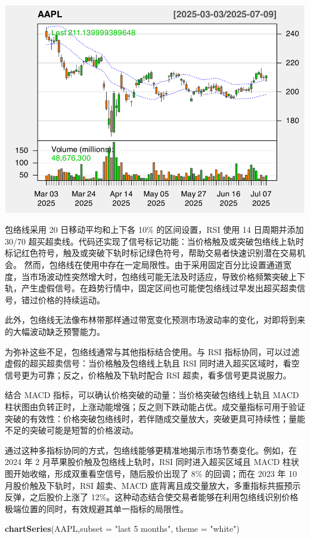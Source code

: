 \documentclass[]{ctexbook}
\newenvironment{Shaded}{\begin{snugshade}}{\end{snugshade}}
\newcommand{\AttributeTok}[1]{\textcolor[rgb]{0.13,0.29,0.53}{#1}}
\newcommand{\FunctionTok}[1]{\textcolor[rgb]{0.13,0.29,0.53}{\textbf{#1}}}
\newcommand{\NormalTok}[1]{#1}
\newcommand{\StringTok}[1]{\textcolor[rgb]{0.31,0.60,0.02}{#1}}
\begin{document}
\includegraphics[width=0.9\linewidth]{quantmod_files/figure-latex/envol-2}

包络线采用 20 日移动平均和上下各 10\% 的区间设置，RSI 使用 14 日周期并添加 30/70 超买超卖线。代码还实现了信号标记功能：当价格触及或突破包络线上轨时标记红色符号，触及或突破下轨时标记绿色符号，帮助交易者快速识别潜在交易机会。
然而，包络线在使用中存在一定局限性。由于采用固定百分比设置通道宽度，当市场波动性突然增大时，包络线可能无法及时适应，导致价格频繁突破上下轨，产生虚假信号。在趋势行情中，固定区间也可能使包络线过早发出超买超卖信号，错过价格的持续运动。

此外，包络线无法像布林带那样通过带宽变化预测市场波动率的变化，对即将到来的大幅波动缺乏预警能力。

为弥补这些不足，包络线通常与其他指标结合使用。与 RSI 指标协同，可以过滤虚假的超买超卖信号：当价格触及包络线上轨且 RSI 同时进入超买区域时，看空信号更为可靠；反之，价格触及下轨时配合 RSI 超卖，看多信号更具说服力。

结合 MACD 指标，可以确认价格突破的动量：当价格突破包络线上轨且 MACD 柱状图由负转正时，上涨动能增强；反之则下跌动能占优。成交量指标可用于验证突破的有效性：价格突破包络线时，若伴随成交量放大，突破更具可持续性；量能不足的突破可能是短暂的价格波动。

通过这种多指标协同的方式，包络线能够更精准地揭示市场节奏变化。例如，在 2024 年 2 月苹果股价触及包络线上轨时，RSI 同时进入超买区域且 MACD 柱状图开始收缩，形成双重看空信号，随后股价出现了 8\% 的回调；而在 2023 年 10 月股价触及下轨时，RSI 超卖、MACD 底背离且成交量放大，多重指标共振预示反弹，之后股价上涨了 12\%。这种动态结合使交易者能够在利用包络线识别价格极端位置的同时，有效规避其单一指标的局限性。

\begin{Shaded}
\begin{Highlighting}[]
\FunctionTok{chartSeries}\NormalTok{(AAPL,}\AttributeTok{subset =} \StringTok{"last 5 months"}\NormalTok{, }\AttributeTok{theme =} \StringTok{"white"}\NormalTok{)}
\end{Highlighting}
\end{Shaded}
\end{document}
